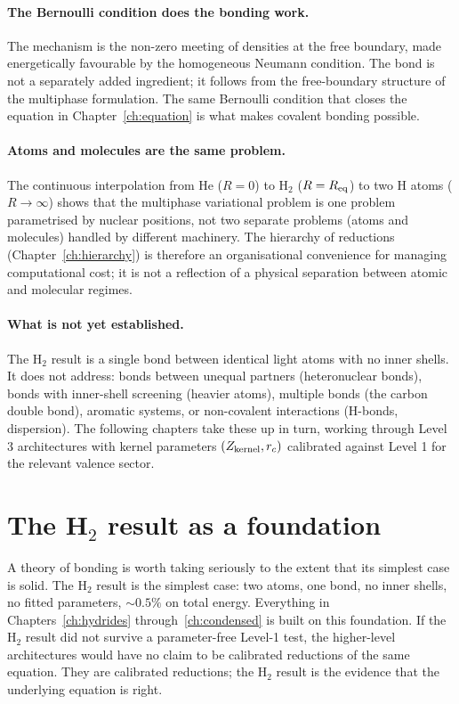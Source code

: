 \paragraph{The Bernoulli condition does the bonding work.} The mechanism is the non-zero meeting of densities at the free boundary, made energetically favourable by the homogeneous Neumann condition. The bond is not a separately added ingredient; it follows from the free-boundary structure of the multiphase formulation. The same Bernoulli condition that closes the equation in Chapter~\ref{ch:equation} is what makes covalent bonding possible.

\paragraph{Atoms and molecules are the same problem.} The continuous interpolation from He ($R = 0$) to H$_2$ ($R = R_{\rm eq}$) to two H atoms ($R \to \infty$) shows that the multiphase variational problem is one problem parametrised by nuclear positions, not two separate problems (atoms and molecules) handled by different machinery. The hierarchy of reductions (Chapter~\ref{ch:hierarchy}) is therefore an organisational convenience for managing computational cost; it is not a reflection of a physical separation between atomic and molecular regimes.

\paragraph{What is not yet established.} The H$_2$ result is a single bond between identical light atoms with no inner shells. It does not address: bonds between unequal partners (heteronuclear bonds), bonds with inner-shell screening (heavier atoms), multiple bonds (the carbon double bond), aromatic systems, or non-covalent interactions (H-bonds, dispersion). The following chapters take these up in turn, working through Level 3 architectures with kernel parameters $(Z_{\rm kernel}, r_c)$ calibrated against Level 1 for the relevant valence sector.

\section{The H$_2$ result as a foundation}\label{sec:h2-foundation}

A theory of bonding is worth taking seriously to the extent that its simplest case is solid. The H$_2$ result is the simplest case: two atoms, one bond, no inner shells, no fitted parameters, $\sim 0.5\%$ on total energy. Everything in Chapters~\ref{ch:hydrides} through~\ref{ch:condensed} is built on this foundation. If the H$_2$ result did not survive a parameter-free Level-1 test, the higher-level architectures would have no claim to be calibrated reductions of the same equation. They are calibrated reductions; the H$_2$ result is the evidence that the underlying equation is right.

